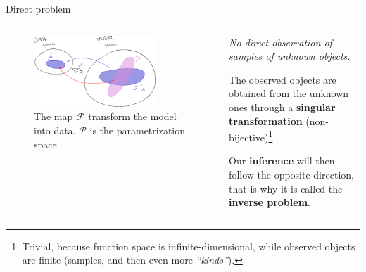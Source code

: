 \documentclass[9pt]{beamer}
\begin{document}
\begin{frame}{Direct problem}
    \begin{columns}
        \begin{column}{0.7\textwidth}
            \begin{figure}
                \centering
                \includegraphics[width=0.8\textwidth]{inverse-problem}
                \vspace*{15pt}
                \caption{
                    The map $\mathcal{F}$ transform the model into data.
                    $\mathcal{P}$ is the parametrization space.
                }
            \end{figure}
        \end{column}
        \begin{column}{0.3\textwidth}
            \begin{center}
                \itshape No direct observation of samples of unknown objects.
            \end{center}

            The observed objects are obtained from the unknown ones through a
            \textbf{singular transformation} (non-bijective)\footnote{
                Trivial, because function space is infinite-dimensional, while
                observed objects are finite (samples, and then even more
                \textit{\enquote{kinds}}).
            }.
            \vspace*{10pt}

            Our \textbf{inference} will then follow the opposite direction,
            that is why it is called the \alert{\textbf{inverse problem}}.
            \vspace*{15pt}
        \end{column}
    \end{columns}
\end{frame}
\end{document}
